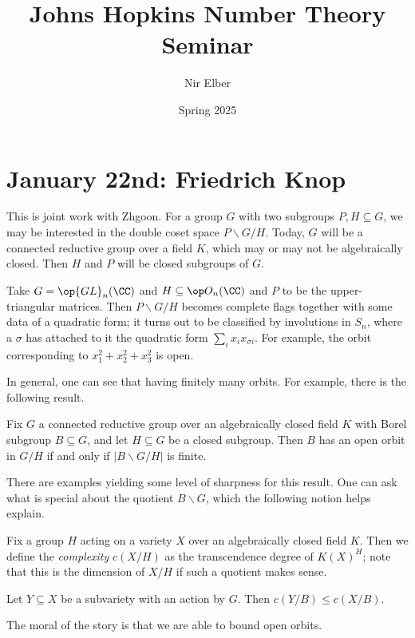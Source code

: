 \documentclass{article}
\title{Johns Hopkins Number Theory Seminar}
\author{Nir Elber}
\date{Spring 2025}
\begin{document}
\maketitle

\tableofcontents

\section{January 22nd: Friedrich Knop}
This is joint work with Zhgoon. For a group $G$ with two subgroups $P,H\subseteq G$, we may be interested in the double coset space $P\backslash G/H$. Today, $G$ will be a connected reductive group over a field $K$, which may or may not be algebraically closed. Then $H$ and $P$ will be closed subgroups of $G$.
\begin{example}
	Take $G=\op{GL}_n(\CC)$ and $H\subseteq\op O_n(\CC)$ and $P$ to be the upper-triangular matrices. Then $P\backslash G/H$ becomes complete flags together with some data of a quadratic form; it turns out to be classified by involutions in $S_n$, where a $\sigma$ has attached to it the quadratic form $\sum_ix_ix_{\sigma i}$. For example, the orbit corresponding to $x_1^2+x_2^2+x_3^2$ is open.
\end{example}
In general, one can see that having finitely many orbits. For example, there is the following result.
\begin{theorem}
	Fix $G$ a connected reductive group over an algebraically closed field $K$ with Borel subgroup $B\subseteq G$, and let $H\subseteq G$ be a closed subgroup. Then $B$ has an open orbit in $G/H$ if and only if $\left|B\backslash G/H\right|$ is finite.
\end{theorem}
There are examples yielding some level of sharpness for this result. One can ask what is special about the quotient $B\backslash G$, which the following notion helps explain.
\begin{definition}[complexity]
	Fix a group $H$ acting on a variety $X$ over an algebraically closed field $K$. Then we define the \textit{complexity} $c(X/H)$ as the transcendence degree of $K(X)^H$; note that this is the dimension of $X/H$ if such a quotient makes sense.
\end{definition}
\begin{theorem}[Vinburg]
	Let $Y\subseteq X$ be a subvariety with an action by $G$. Then $c(Y/B)\le c(X/B)$.
\end{theorem}
The moral of the story is that we are able to bound open orbits.
\end{document}
